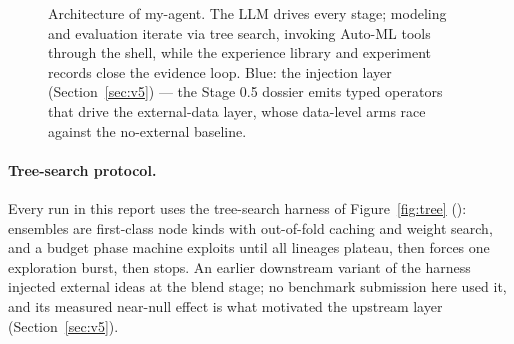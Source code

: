 \documentclass[11pt,a4paper]{article}
\begin{document}
\begin{figure}[htbp]
\caption{Architecture of my-agent. The LLM drives every stage; modeling and evaluation iterate
via tree search, invoking Auto-ML tools through the shell, while the experience library and
experiment records close the evidence loop. Blue: the injection layer
(Section~\ref{sec:v5}) --- the Stage 0.5 dossier emits typed operators that drive the
external-data layer, whose data-level arms race against the no-external baseline.}
\label{fig:arch}
\end{figure}

\paragraph{Tree-search protocol.} Every run in this report uses the tree-search harness of Figure~\ref{fig:tree} (): ensembles are first-class node kinds with out-of-fold caching and weight search, and a budget phase machine exploits until all lineages plateau, then forces one exploration burst, then stops. An earlier downstream variant of the harness injected external ideas at the blend stage; no benchmark submission here used it, and its measured near-null effect is what motivated the upstream layer (Section~\ref{sec:v5}).
\end{document}
